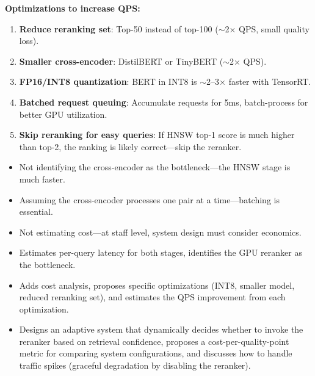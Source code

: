 \begin{interviewq}
\textbf{Optimizations to increase QPS:}
\begin{enumerate}
    \item \textbf{Reduce reranking set}: Top-50 instead of top-100 ($\sim$2$\times$ QPS, small quality loss).
    \item \textbf{Smaller cross-encoder}: DistilBERT or TinyBERT ($\sim$2$\times$ QPS).
    \item \textbf{FP16/INT8 quantization}: BERT in INT8 is $\sim$2--3$\times$ faster with TensorRT.
    \item \textbf{Batched request queuing}: Accumulate requests for 5ms, batch-process for better GPU utilization.
    \item \textbf{Skip reranking for easy queries}: If HNSW top-1 score is much higher than top-2, the ranking is likely correct---skip the reranker.
\end{enumerate}

\redflags
\begin{itemize}
    \item Not identifying the cross-encoder as the bottleneck---the HNSW stage is much faster.
    \item Assuming the cross-encoder processes one pair at a time---batching is essential.
    \item Not estimating cost---at staff level, system design must consider economics.
\end{itemize}


\goodgreat
\begin{itemize}
    \item {} Estimates per-query latency for both stages, identifies the GPU reranker as the bottleneck.
    \item {} Adds cost analysis, proposes specific optimizations (INT8, smaller model, reduced reranking set), and estimates the QPS improvement from each optimization.
    \item {} Designs an adaptive system that dynamically decides whether to invoke the reranker based on retrieval confidence, proposes a cost-per-quality-point metric for comparing system configurations, and discusses how to handle traffic spikes (graceful degradation by disabling the reranker).
\end{itemize}

\end{interviewq}